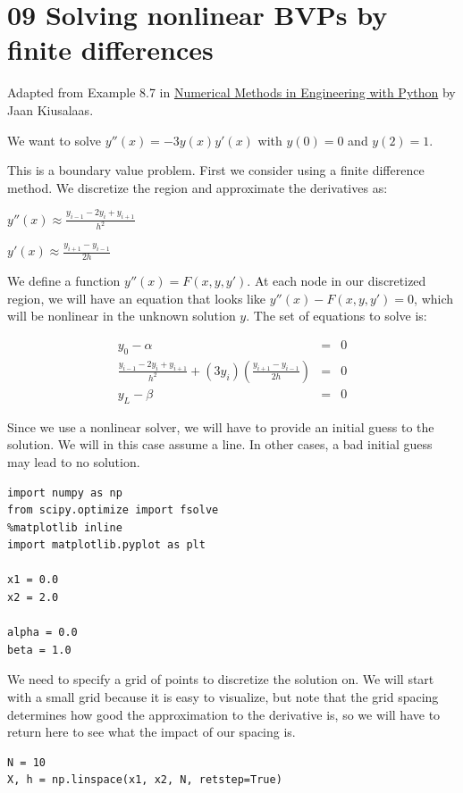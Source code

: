 \documentclass[11pt]{article}
\begin{document}
\section{09 Solving nonlinear BVPs by finite differences}
\label{sec:org136131a}

Adapted from Example 8.7 in \uline{Numerical Methods in Engineering with Python} by Jaan Kiusalaas.

We want to solve \(y''(x) = -3 y(x) y'(x)\) with \(y(0) = 0\) and \(y(2) = 1\).

This is a boundary value problem. First we consider using a finite difference method. We discretize the region and approximate the derivatives as:

\(y''(x) \approx \frac{y_{i-1} - 2 y_i + y_{i+1}}{h^2}\)

\(y'(x) \approx \frac{y_{i+1} - y_{i-1}}{2 h}\)

We define a function \(y''(x) = F(x, y, y')\). At each node in our discretized region, we will have an equation that looks like \(y''(x) - F(x, y, y') = 0\), which will be nonlinear in the unknown solution \(y\). The set of equations to solve is:

\begin{eqnarray}
y_0 - \alpha &=& 0 \\
\frac{y_{i-1} - 2 y_i + y_{i+1}}{h^2} + (3 y_i) (\frac{y_{i+1} - y_{i-1}}{2 h}) &=& 0 \\
y_L - \beta &=&0
\end{eqnarray}

Since we use a nonlinear solver, we will have to provide an initial guess to the solution. We will in this case assume a line. In other cases, a bad initial guess may lead to no solution.

\begin{verbatim}
import numpy as np
from scipy.optimize import fsolve
%matplotlib inline
import matplotlib.pyplot as plt

x1 = 0.0
x2 = 2.0

alpha = 0.0
beta = 1.0
\end{verbatim}

We need to specify a grid of points to discretize the solution on. We will start with a small grid because it is easy to visualize, but note that the grid spacing determines how good the approximation to the derivative is, so we will have to return here to see what the impact of our spacing is.

\begin{verbatim}
N = 10
X, h = np.linspace(x1, x2, N, retstep=True)
\end{verbatim}
\end{document}
